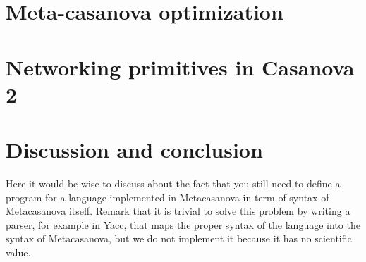 \documentclass[8pt,a5paper]{extbook}
\begin{document}
\chapter{Meta-casanova optimization}

	
\chapter{Networking primitives in Casanova 2}


\chapter{Discussion and conclusion}
Here it would be wise to discuss about the fact that you still need to define a program for a language implemented in Metacasanova in term of syntax of Metacasanova itself. Remark that it is trivial to solve this problem by writing a parser, for example in Yacc, that maps the proper syntax of the language into the syntax of Metacasanova, but we do not implement it because it has no scientific value.



\end{document}
